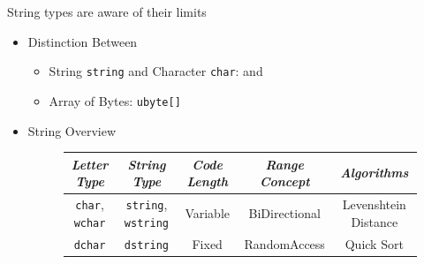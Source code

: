 \documentclass[xcolor=dvipsnames]{beamer}
\begin{document}
\begin{frame}[fragile]{String types are aware of their limits}
  \begin{itemize}[<+->]
  \item Distinction Between
    \begin{itemize}[<+->]
    \item String \texttt{string} and Character \texttt{char}:  and
    \item Array of Bytes: \texttt{ubyte[]}
    \end{itemize}
  \item String Overview
  \begin{figure}
  \tiny
  \begin{tabular}{ c | c | c | c | c }
    \textit{Letter Type} & \textit{String Type} & \textit{Code Length} & \textit{Range Concept} & \textit{Algorithms} \\
    \hline
    \texttt{char}, \texttt{wchar} & \texttt{string}, \texttt{wstring} & Variable & BiDirectional & Levenshtein Distance\\
    \hline
    \texttt{dchar} & \texttt{dstring} & Fixed & RandomAccess & Quick Sort\\
  \end{tabular}
  \end{figure}
  \end{itemize}
\end{frame}
\end{document}
